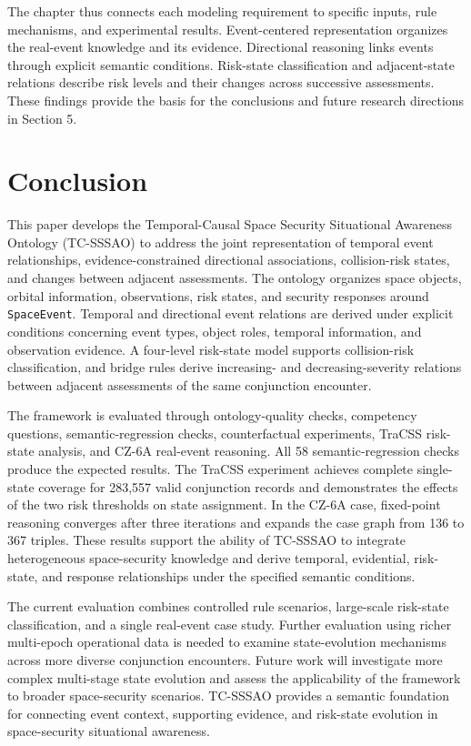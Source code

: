\documentclass[Royal,sageh,times]{sagej}
\newcommand{\ont}[1]{{\urlstyle{tt}\nolinkurl{#1}}}
\begin{document}
The chapter thus connects each modeling requirement to specific inputs, rule mechanisms, and experimental results. Event-centered representation organizes the real-event knowledge and its evidence. Directional reasoning links events through explicit semantic conditions. Risk-state classification and adjacent-state relations describe risk levels and their changes across successive assessments. These findings provide the basis for the conclusions and future research directions in Section 5.
\section{Conclusion}

This paper develops the Temporal-Causal Space Security Situational Awareness Ontology (TC-SSSAO) to address the joint representation of temporal event relationships, evidence-constrained directional associations, collision-risk states, and changes between adjacent assessments. The ontology organizes space objects, orbital information, observations, risk states, and security responses around \ont{SpaceEvent}. Temporal and directional event relations are derived under explicit conditions concerning event types, object roles, temporal information, and observation evidence. A four-level risk-state model supports collision-risk classification, and bridge rules derive increasing- and decreasing-severity relations between adjacent assessments of the same conjunction encounter.

The framework is evaluated through ontology-quality checks, competency questions, semantic-regression checks, counterfactual experiments, TraCSS risk-state analysis, and CZ-6A real-event reasoning. All 58 semantic-regression checks produce the expected results. The TraCSS experiment achieves complete single-state coverage for 283,557 valid conjunction records and demonstrates the effects of the two risk thresholds on state assignment. In the CZ-6A case, fixed-point reasoning converges after three iterations and expands the case graph from 136 to 367 triples. These results support the ability of TC-SSSAO to integrate heterogeneous space-security knowledge and derive temporal, evidential, risk-state, and response relationships under the specified semantic conditions.

The current evaluation combines controlled rule scenarios, large-scale risk-state classification, and a single real-event case study. Further evaluation using richer multi-epoch operational data is needed to examine state-evolution mechanisms across more diverse conjunction encounters. Future work will investigate more complex multi-stage state evolution and assess the applicability of the framework to broader space-security scenarios. TC-SSSAO provides a semantic foundation for connecting event context, supporting evidence, and risk-state evolution in space-security situational awareness.
\end{document}
